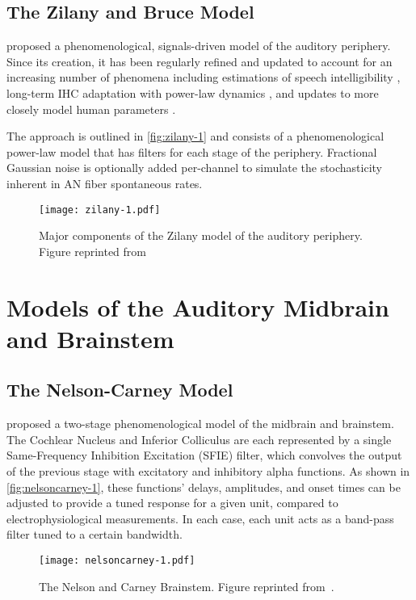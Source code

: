 \subsection{The Zilany and Bruce Model} %
\label{sub:the_zilany_and_bruce_model}
\cite{Zilany2006Modeling} proposed a phenomenological, signals-driven model of the auditory periphery.  Since its creation, it has been regularly refined and updated to account for an increasing number of phenomena including estimations of speech intelligibility \citep{Zilany2007Predictions}, long-term IHC adaptation with power-law dynamics \citep{Zilany2009Phenomenological}, and updates to more closely model human parameters \citep{Zilany2014Updated}.  

The approach is outlined in \autoref{fig:zilany-1} and consists of a phenomenological power-law model that has filters for each stage of the periphery.  Fractional Gaussian noise is optionally added per-channel to simulate the stochasticity inherent in AN fiber spontaneous rates. 

\begin{figure}[htbp]
	\centering
	\texttt{[image: zilany-1.pdf]}
	\caption[The Zilany Model]{Major components of the Zilany model of the auditory periphery.  Figure reprinted from~\cite{Zilany2009Phenomenological}}
	\label{fig:zilany-1}
\end{figure}
\section{Models of the Auditory Midbrain and Brainstem} %
\label{sec:models_of_the_auditory_midbrain_and_brainstem}
\subsection{The Nelson-Carney Model} %
\label{sub:the_nelson_carney_model}
\cite{Nelson2004Phenomenological} proposed a two-stage phenomenological model of the midbrain and brainstem.  The Cochlear Nucleus and Inferior Colliculus are each represented by a single Same-Frequency Inhibition Excitation (SFIE) filter, which convolves the output of the previous stage with  excitatory and inhibitory alpha functions.  As shown in \autoref{fig:nelsoncarney-1}, these functions' delays, amplitudes, and onset times can be adjusted to provide a tuned response for a given unit, compared to electrophysiological measurements.  In each case, each unit acts as a band-pass filter tuned to a certain bandwidth. 
\begin{figure}[htbp]
	\centering
	\texttt{[image: nelsoncarney-1.pdf]}
	\caption[The Nelson and Carney Model]{The Nelson and Carney Brainstem. Figure reprinted from~\cite{Nelson2004Phenomenological}.}
	\label{fig:nelsoncarney-1}
\end{figure}

